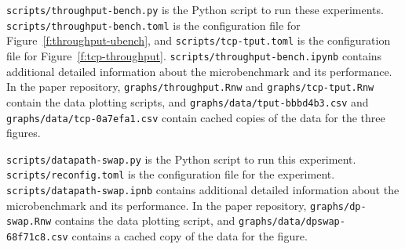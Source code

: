\begin{appendix}
 \texttt{scripts/throughput-bench.py} is the Python script to run these experiments. \texttt{scripts/throughput-bench.toml} is the configuration file for Figure~\ref{f:throughput-ubench}, and \texttt{scripts/tcp-tput.toml} is the configuration file for Figure~\ref{f:tcp-throughput}. \texttt{scripts/throughput-bench.ipynb} contains additional detailed information about the microbenchmark and its performance.
In the paper repository, \texttt{graphs/throughput.Rnw} and \texttt{graphs/tcp-tput.Rnw} contain the data plotting scripts, and \texttt{graphs/data/tput-bbbd4b3.csv} and \texttt{graphs/data/tcp-0a7efa1.csv} contain cached copies of the data for the three figures.

 \texttt{scripts/datapath-swap.py} is the Python script to run this experiment. \texttt{scripts/reconfig.toml} is the configuration file for the experiment. \texttt{scripts/datapath-swap.ipnb} contains additional detailed information about the microbenchmark and its performance.
In the paper repository, \texttt{graphs/dp-swap.Rnw} contains the data plotting script, and \texttt{graphs/data/dpswap-68f71c8.csv} contains a cached copy of the data for the figure.

\end{appendix}